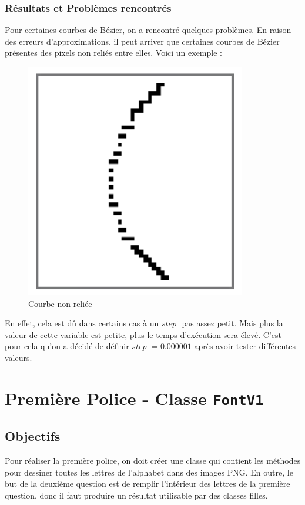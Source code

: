 \documentclass[a4paper, 12pt]{article}
\begin{document}
\subsubsection{Résultats et Problèmes rencontrés}
Pour certaines courbes de Bézier, on a rencontré quelques problèmes. En raison des erreurs d'approximations, il peut arriver que certaines courbes de Bézier présentes des pixels non reliés entre elles. Voici un exemple : 

\begin{figure}[h]
\centering
\includegraphics[scale=0.3]{Images/BezierCurbe_problem.png}
\caption{Courbe non reliée}
\label{fig2}
\end{figure}

En effet, cela est dû dans certains cas à un $step\_$ pas assez petit. Mais plus la valeur de cette variable est petite, plus le temps d’exécution sera élevé. C'est pour cela qu'on a décidé de définir $step\_ = 0.000001$ après avoir tester différentes valeurs.

\newpage
\section{Première Police - Classe \texttt{FontV1}}	
\subsection{Objectifs}
Pour réaliser la première police, on doit créer une classe qui contient les méthodes pour dessiner toutes les lettres de l'alphabet dans des images PNG. En outre, le but de la deuxième question est de remplir l'intérieur des lettres de la première question, donc il faut produire un résultat utilisable par des classes filles.
\end{document}

